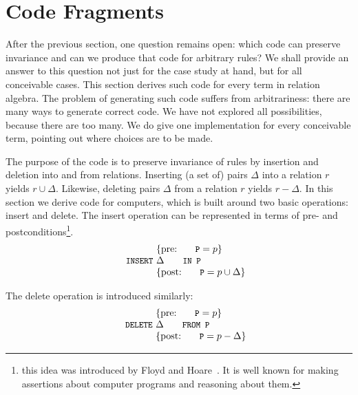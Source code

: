 \documentclass{svproc}
\begin{document}
\section{Code Fragments}
\label{sct:Code Fragments}
	After the previous section, one question remains open: which code can preserve invariance and can we produce that code for arbitrary rules?
	We shall provide an answer to this question not just for the case study at hand, but for all conceivable cases.
	This section derives such code for every term in relation algebra.
	The problem of generating such code suffers from arbitrariness: there are many ways to generate correct code.
	We have not explored all possibilities, because there are too many.
	We do give one implementation for every conceivable term, pointing out where choices are to be made.

	The purpose of the code is to preserve invariance of rules by insertion and deletion into and from relations.
	Inserting (a set of) pairs $\Delta$ into a relation $r$ yields $r\cup\Delta$.
	Likewise, deleting pairs $\Delta$ from a relation $r$ yields $r-\Delta$.
	In this section we derive code for computers,
	which is built around two basic operations: insert and delete.
	The insert operation can be represented in terms of pre- and postconditions\footnote{this idea
	was introduced by Floyd and Hoare~\cite{Floyd1967,Hoare1969}.
	It is well known for making assertions about computer programs and reasoning about them.}.
\[\begin{array}{r@{~}l}
&\{\text{pre: }\code{P}=p\}\\
\code{INSERT}&\Delta\code{ IN P}\\
&\{\text{post: }\code{P}=p\cup\Delta\}\\
\end{array}\]

	The delete operation is introduced similarly:
\[\begin{array}{r@{~}l}
&\{\text{pre: }\code{P}=p\}\\
\code{DELETE}&\Delta\code{ FROM P}\\
&\{\text{post: }\code{P}=p-\Delta\}\\
\end{array}\]
	
\end{document}
